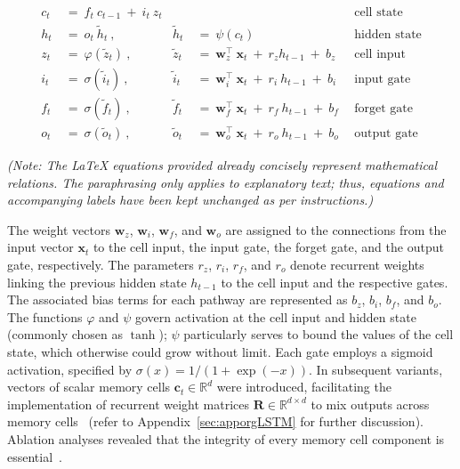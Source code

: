 \begin{align}
c_t \ &= \  f_t \ c_{t-1} \ + \ i_t \ z_t &  & &\text{cell state} \\
h_t  \ &= \ o_t \ \tilde{h}_t \ , & \tilde{h}_t \ &= \ \psi \left( c_t\right)
  &\text{hidden state} \\
z_t \ &= \ \varphi \left( \tilde{z}_t \right) \ , 
  &\tilde{z}_t \ &=  \ \mathbf{w}^\top_{z} \ \mathbf{x}_t \ + \
  r_{z}  h_{t-1} \ + \  b_{z} \ \
  &\text{cell input} \\
i_t \ &= \ \sigma \left( \tilde{i}_t  \right) \ , 
  &\tilde{i}_t \ &= \ \mathbf{w}^\top_{i} \ \mathbf{x}_t \ + \
  r_{i}  \ h_{t-1} \ + \  b_{i} \ \
  &\text{input gate} \\
f_t \ &= \ \sigma \left(  \tilde{f}_t \right) \ , 
  &\tilde{f}_t \ &= \ \mathbf{w}^\top_{f} \ \mathbf{x}_t  \ + \
  r_{f}  \ h_{t-1} \ + \  b_{f} \ \
  &\text{forget gate} \\
o_t \ &= \ \sigma \left( \tilde{o}_t \right) \ , 
  &\tilde{o}_t  \ &= \ \mathbf{w}^\top_{o} \ \mathbf{x}_t \ + \
  r_{o}  \ h_{t-1} \ + \  b_{o} \ \
  &\text{output gate} 
\end{align}

\textit{(Note: The LaTeX equations provided already concisely represent mathematical relations. The paraphrasing only applies to explanatory text; thus, equations and accompanying labels have been kept unchanged as per instructions.)}

The weight vectors $\mathbf{w}_{z}$, $\mathbf{w}_{i}$, $\mathbf{w}_{f}$, and $\mathbf{w}_{o}$ are assigned to the connections from the input vector $\mathbf{x}_t$ to the cell input, the input gate, the forget gate, and the output gate, respectively. The parameters $r_{z}$, $r_{i}$, $r_{f}$, and $r_{o}$ denote recurrent weights linking the previous hidden state $h_{t-1}$ to the cell input and the respective gates. The associated bias terms for each pathway are represented as $b_{z}$, $b_{i}$, $b_{f}$, and $b_{o}$. The functions $\varphi$ and $\psi$ govern activation at the cell input and hidden state (commonly chosen as $\tanh$); $\psi$ particularly serves to bound the values of the cell state, which otherwise could grow without limit. Each gate employs a sigmoid activation, specified by $\sigma \left( x \right)= 1/(1+\exp(-x))$. In subsequent variants, vectors of scalar memory cells $\mathbf{c}_t \in \mathbb{R}^d$ were introduced, facilitating the implementation of recurrent weight matrices $\mathbf{R} \in \mathbb{R}^{d \times d}$ to mix outputs across memory cells~\citep{Greff:15} (refer to Appendix~\ref{sec:apporgLSTM} for further discussion). Ablation analyses revealed that the integrity of every memory cell component is essential~\citep{Greff:15}.

